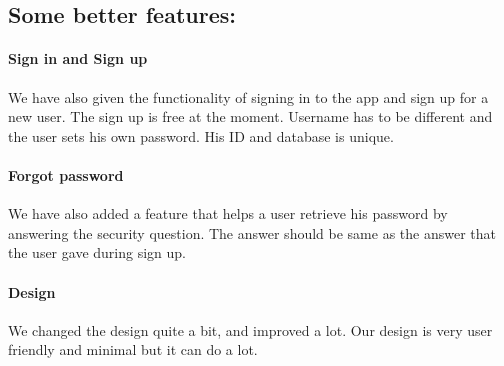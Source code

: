 \documentclass{article}
\begin{document}
	\subsection{Some better features: }
	\paragraph{Sign in and Sign up }We have also given the functionality of signing in to the app and sign up for a new user. The sign up is free at the moment. Username has to be different and the user sets his own password. His ID and database is unique.
	\paragraph{Forgot password }We have also added a feature that helps a user retrieve his password by answering the security question. The answer should be same as the answer that the user gave during sign up.
	\paragraph{Design }We changed the design quite a bit, and improved a lot. Our design is very user friendly and minimal but it can do a lot.
	
\end{document}

